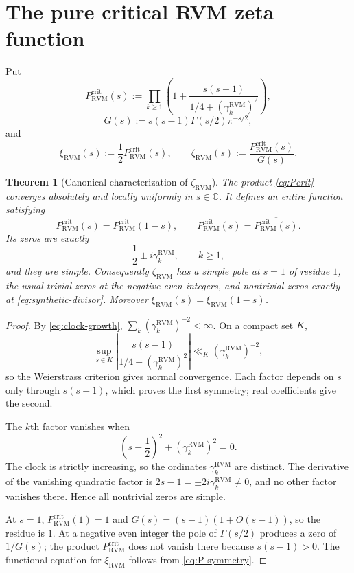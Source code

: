\documentclass[11pt,reqno]{amsart}
\newtheorem{theorem}{Theorem}[section]
\theoremstyle{definition}
\theoremstyle{remark}
\newcommand{\C}{\mathbb C}
\newcommand{\RVM}{\mathrm{RVM}}
\newcommand{\crit}{\mathrm{crit}}
\begin{document}
\section{The pure critical RVM zeta function}

Put
\begin{equation}\label{eq:Pcrit}
 P_{\RVM}^{\crit}(s)
 :=\prod_{k\ge1}
 \left(1+\frac{s(s-1)}{1/4+(\gamma_k^{\RVM})^2}\right),
\end{equation}
\begin{equation}\label{eq:Gdef}
 G(s):=s(s-1)\Gamma(s/2)\pi^{-s/2},
\end{equation}
and
\begin{equation}\label{eq:zetaRVM}
 \xi_{\RVM}(s):=\frac12P_{\RVM}^{\crit}(s),
 \qquad
 \zeta_{\RVM}(s):=\frac{P_{\RVM}^{\crit}(s)}{G(s)}.
\end{equation}

\begin{theorem}[Canonical characterization of $\zeta_{\RVM}$]\label{thm:canonical}
The product \eqref{eq:Pcrit} converges absolutely and locally uniformly in $s\in\C$.  It defines an entire function satisfying
\begin{equation}\label{eq:P-symmetry}
 P_{\RVM}^{\crit}(s)=P_{\RVM}^{\crit}(1-s),
 \qquad
 P_{\RVM}^{\crit}(\bar s)=\overline{P_{\RVM}^{\crit}(s)}.
\end{equation}
Its zeros are exactly
\begin{equation}\label{eq:synthetic-divisor}
 \frac12\pm i\gamma_k^{\RVM},
 \qquad k\ge1,
\end{equation}
and they are simple.  Consequently $\zeta_{\RVM}$ has a simple pole at $s=1$ of residue $1$, the usual trivial zeros at the negative even integers, and nontrivial zeros exactly at \eqref{eq:synthetic-divisor}.  Moreover
$\xi_{\RVM}(s)=\xi_{\RVM}(1-s)$.
\end{theorem}

\begin{proof}
By \eqref{eq:clock-growth},
$\sum_k(\gamma_k^{\RVM})^{-2}<\infty$.  On a compact set $K$,
\[
 \sup_{s\in K}
 \left|\frac{s(s-1)}{1/4+(\gamma_k^{\RVM})^2}\right|
 \ll_K (\gamma_k^{\RVM})^{-2},
\]
so the Weierstrass criterion gives normal convergence.  Each factor depends on $s$ only through $s(s-1)$, which proves the first symmetry; real coefficients give the second.

The $k$th factor vanishes when
\[
 \left(s-\frac12\right)^2+(\gamma_k^{\RVM})^2=0.
\]
The clock is strictly increasing, so the ordinates $\gamma_k^{\RVM}$ are distinct.  The derivative of the vanishing quadratic factor is $2s-1=\pm2i\gamma_k^{\RVM}\ne0$, and no other factor vanishes there.  Hence all nontrivial zeros are simple.

At $s=1$, $P_{\RVM}^{\crit}(1)=1$ and
$G(s)=(s-1)(1+O(s-1))$, so the residue is $1$.  At a negative even integer the pole of $\Gamma(s/2)$ produces a zero of $1/G(s)$; the product $P_{\RVM}^{\crit}$ does not vanish there because $s(s-1)>0$.  The functional equation for $\xi_{\RVM}$ follows from \eqref{eq:P-symmetry}.
\end{proof}
\end{document}
